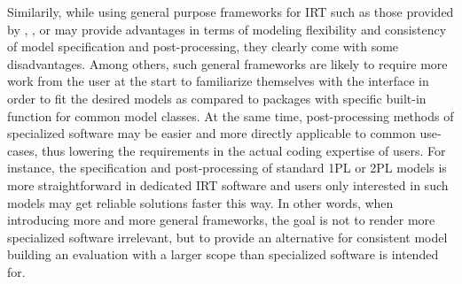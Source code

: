 \documentclass[jss]{jss}
\begin{document}
Similarily, while using general purpose frameworks for IRT such as those
provided by , , or  may provide
advantages in terms of modeling flexibility and consistency of model
specification and post-processing, they clearly come with some
disadvantages. Among others, such general frameworks are likely to
require more work from the user at the start to familiarize themselves
with the interface in order to fit the desired models as compared to
packages with specific built-in function for common model classes. At
the same time, post-processing methods of specialized software may be
easier and more directly applicable to common use-cases, thus lowering
the requirements in the actual coding expertise of users. For instance,
the specification and post-processing of standard 1PL or 2PL models is
more straightforward in dedicated IRT software and users only interested
in such models may get reliable solutions faster this way. In other
words, when introducing more and more general frameworks, the goal is
not to render more specialized software irrelevant, but to provide an
alternative for consistent model building an evaluation with a larger
scope than specialized software is intended for.
\end{document}
